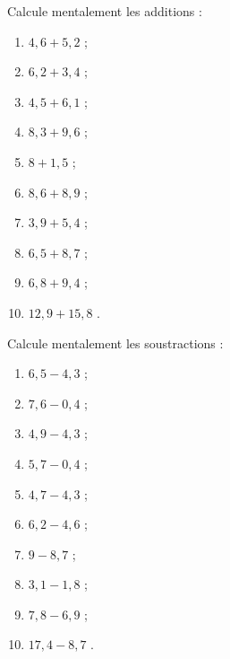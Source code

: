 \begin{exercice}
Calcule mentalement les additions :
\begin{enumerate} 
 \item $4,6 + 5,2$ \dotfill ; 
 
 \item $6,2 + 3,4$ \dotfill ; 
 
 \item $4,5 + 6,1$ \dotfill ; 
 
 \item $8,3 + 9,6$ \dotfill ; 
 
 \item $8 + 1,5$ \dotfill ; 
 
 \item $8,6 + 8,9$ \dotfill ; 
 
 \item $3,9 + 5,4$ \dotfill ; 
 
 \item $6,5 + 8,7$ \dotfill ; 
 
 \item $6,8 + 9,4$ \dotfill ; 
 
 \item \hspace{0.1em} $12,9 + 15,8$ \dotfill. 
 \end{enumerate}
\end{exercice}
\begin{exercice}
Calcule mentalement les soustractions :
\begin{enumerate} 
 \item $6,5 - 4,3$ \dotfill ; 
 
 \item $7,6 - 0,4$ \dotfill ; 
 
 \item $4,9 - 4,3$ \dotfill ; 
 
 \item $5,7 - 0,4$ \dotfill ; 
 
 \item $4,7 - 4,3$ \dotfill ; 
 
 \item $6,2 - 4,6$ \dotfill ; 
 
 \item $9 - 8,7$ \dotfill ; 
 
 \item $3,1 - 1,8$ \dotfill ; 
 
 \item $7,8 - 6,9$ \dotfill ; 
 
 \item \hspace{0.2em}$17,4 - 8,7$ \dotfill. 
 
 \end{enumerate}  
\end{exercice}
